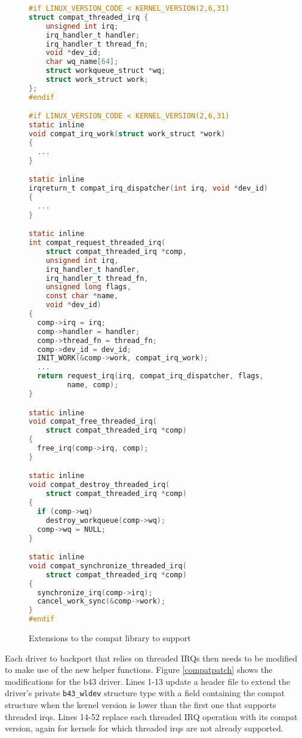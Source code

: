 \begin{figure}[h!]
\begin{lstlisting}[language=C]
#if LINUX_VERSION_CODE < KERNEL_VERSION(2,6,31)
struct compat_threaded_irq {
	unsigned int irq;
	irq_handler_t handler;
	irq_handler_t thread_fn;
	void *dev_id;
	char wq_name[64];
	struct workqueue_struct *wq;
	struct work_struct work;
};
#endif

#if LINUX_VERSION_CODE < KERNEL_VERSION(2,6,31)
static inline
void compat_irq_work(struct work_struct *work)
{
  ...
}

static inline
irqreturn_t compat_irq_dispatcher(int irq, void *dev_id)
{
  ...
}

static inline
int compat_request_threaded_irq(
	struct compat_threaded_irq *comp,
	unsigned int irq,
	irq_handler_t handler,
	irq_handler_t thread_fn,
	unsigned long flags,
	const char *name,
	void *dev_id)
{
  comp->irq = irq;
  comp->handler = handler;
  comp->thread_fn = thread_fn;
  comp->dev_id = dev_id;
  INIT_WORK(&comp->work, compat_irq_work);
  ...
  return request_irq(irq, compat_irq_dispatcher, flags,
		 name, comp);
}

static inline
void compat_free_threaded_irq(
	struct compat_threaded_irq *comp)
{
  free_irq(comp->irq, comp);
}

static inline
void compat_destroy_threaded_irq(
	struct compat_threaded_irq *comp)
{
  if (comp->wq)
    destroy_workqueue(comp->wq);
  comp->wq = NULL;
}

static inline
void compat_synchronize_threaded_irq(
	struct compat_threaded_irq *comp)
{
  synchronize_irq(comp->irq);
  cancel_work_sync(&comp->work);
}
#endif
\end{lstlisting}
\caption{Extensions to the compat library to support }
\label{compat}
\end{figure}

Each driver to backport that relies on threaded IRQs then needs to be
modified to make use of the new helper functions.  Figure \ref{compatpatch}
shows the modifications for the b43 driver.  Lines 1-13 update a header
file to extend the driver's private {\tt b43\_\-wldev} structure type with
a field containing the compat structure when the kernel version is lower
than the first one that supports threaded irqs.  Lines 14-52 replace each
threaded IRQ operation with its compat version, again for kernels for which
threaded irqs are not already supported.

